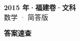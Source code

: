 \documentclass[zihao=-4, a4paper]{ctexart}
\begin{document}
\begin{center}
  {\Large\bfseries 2015 年·福建卷·文科}\\[4pt]
  {\large 数学 · 简答版}
\end{center}
\medskip
{}

\clearpage
{}
\begin{center}{\Large\bfseries 答案速查}\end{center}
\medskip

\end{document}
